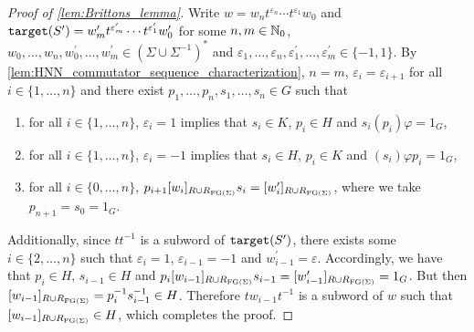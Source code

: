 \begin{proof}[Proof of \cref{lem:Brittons_lemma}]
  Write $w = w_n t^{\varepsilon_n}\cdots t^{\varepsilon_1} w_0$ and
  $\texttt{target}(S^\prime) = w_m^\prime t^{\varepsilon_m^\prime} \cdots t^{\varepsilon_1^\prime} w_0^\prime$
  for some $n, m\in \mathbb{N}_0$, $w_0,\ldots, w_n, w_0^\prime, \ldots, w_m^\prime\in (\Sigma\cup
  \Sigma^{-1})^\ast$ and $\varepsilon_1, \ldots, \varepsilon_n, \varepsilon_1^\prime, \ldots,
  \varepsilon_m^\prime \in\{-1, 1\}$.
  By \cref{lem:HNN_commutator_sequence_characterization},
  $n = m$, $\varepsilon_i = \varepsilon_{i+1}$ for all $i\in\{1, \ldots, n\}$ and there exist
  $p_1,\ldots, p_n, s_1,\ldots, s_n\in G$ such that
  \begin{enumerate}
    \item for all $i\in\{1, \ldots, n\}$, $\varepsilon_i = 1$ implies that $s_i\in K$, $p_i \in
      H$ and $s_i(p_i)\varphi = 1_G$,
    \item for all $i\in \{1, \ldots, n\}$, $\varepsilon_i = -1$ implies that $s_i\in H$, $p_i \in
      K$ and $(s_i)\varphi p_i = 1_G$,
    \item for all $i\in\{0, \ldots, n\}$, $p_{i+1} [w_i]_{R\cup R_{\textrm{FG}(\Sigma)}} s_i =
      [w_i^\prime]_{R\cup R_{\textrm{FG}(\Sigma)}}$, where we take $p_{n+1} = s_0 = 1_G$.
  \end{enumerate}
  Additionally, since $tt^{-1}$ is a subword of $\texttt{target}(S^\prime)$, there exists some
  $i\in\{2,\ldots, n\}$ such that $\varepsilon_i = 1$, $\varepsilon_{i-1} = -1$ and
  $w_{i-1}^\prime = \varepsilon$. Accordingly, we have that
  $p_i \in H$, $s_{i-1}\in H$ and $p_{i} [w_{i-1}]_{R\cup R_{\textrm{FG}(\Sigma)}} s_{i-1} =
  [w_{i-1}^\prime]_{R\cup R_{\textrm{FG}(\Sigma)}} = 1_G$.
  But then $[w_{i-1}]_{R\cup R_{\textrm{FG}(\Sigma)}} = p_{i}^{-1}s_{i-1}^{-1}\in H$.
  Therefore $tw_{i-1}t^{-1}$ is a subword of $w$ such that $[w_{i-1}]_{R\cup R_{\textrm{FG}(\Sigma)}}\in
  H$, which completes the proof.
\end{proof}



